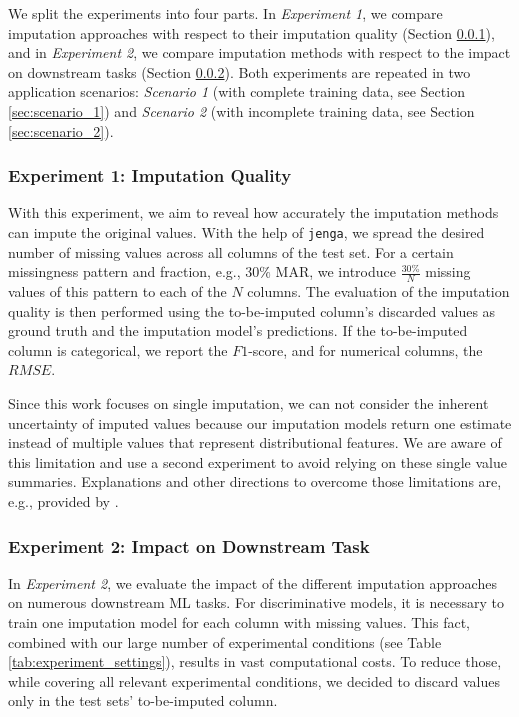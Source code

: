 \documentclass[utf8]{frontiersSCNS} %
\newcommand{\code}[1]{\texttt{#1}}
\begin{document}
We split the experiments into four parts. In \emph{Experiment 1}, we compare imputation approaches with respect to their imputation quality (Section \ref{sec:experiment_1}), and in \emph{Experiment 2}, we compare imputation methods with respect to the impact on downstream tasks (Section \ref{sec:experiment_2}). Both experiments are repeated in two application scenarios: \emph{Scenario 1} (with complete training data, see Section \ref{sec:scenario_1}) and \emph{Scenario 2} (with incomplete training data, see Section \ref{sec:scenario_2}).

\subsubsection{Experiment 1: Imputation Quality}
\label{sec:experiment_1}
%
With this experiment, we aim to reveal how accurately the imputation methods can impute the original values.
With the help of \code{jenga}, we spread the desired number of missing values across all columns of the test set. For a certain missingness pattern and fraction, e.g., $30\%$ MAR, we introduce $\frac{30\%}{N}$ missing values of this pattern to each of the $N$ columns.
The evaluation of the imputation quality is then performed using the to-be-imputed column's discarded values as ground truth and the imputation model's predictions. If the to-be-imputed column is categorical, we report the $F1$-score, and for numerical columns, the $RMSE$.

Since this work focuses on single imputation, we can not consider the inherent uncertainty of imputed values because our imputation models return one estimate instead of multiple values that represent distributional features. We are aware of this limitation and use a second experiment to avoid relying on these single value summaries. Explanations and other directions to overcome those limitations are, e.g., provided by \cite{limitations}.


\subsubsection{Experiment 2: Impact on Downstream Task}
\label{sec:experiment_2}
%
In \emph{Experiment 2}, we evaluate the impact of the different imputation approaches on numerous downstream ML tasks. For discriminative models, it is necessary to train one imputation model for each column with missing values. This fact, combined with our large number of experimental conditions (see Table \ref{tab:experiment_settings}), results in vast computational costs. To reduce those, while covering all relevant experimental conditions, we decided to discard values only in the test sets' to-be-imputed column.
\end{document}
